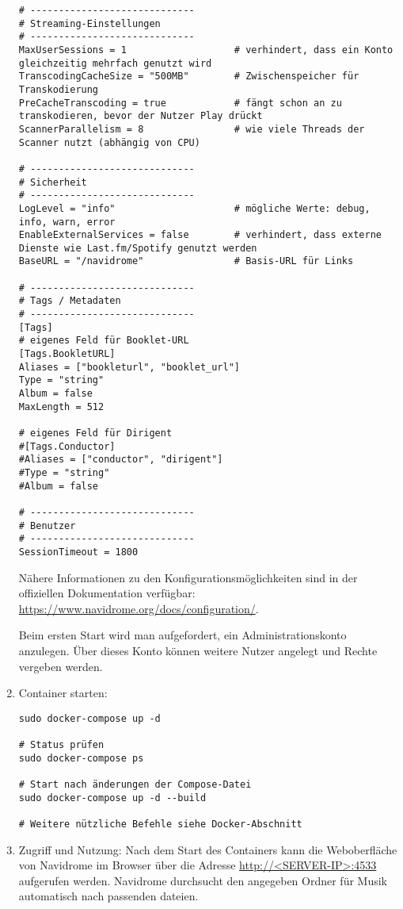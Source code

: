 \documentclass[12pt,a4paper]{report}
\begin{document}
\begin{enumerate}
\begin{verbatim}
# -----------------------------
# Streaming-Einstellungen
# -----------------------------
MaxUserSessions = 1                   # verhindert, dass ein Konto gleichzeitig mehrfach genutzt wird
TranscodingCacheSize = "500MB"        # Zwischenspeicher für Transkodierung
PreCacheTranscoding = true            # fängt schon an zu transkodieren, bevor der Nutzer Play drückt
ScannerParallelism = 8                # wie viele Threads der Scanner nutzt (abhängig von CPU)

# -----------------------------
# Sicherheit
# -----------------------------
LogLevel = "info"                     # mögliche Werte: debug, info, warn, error
EnableExternalServices = false        # verhindert, dass externe Dienste wie Last.fm/Spotify genutzt werden
BaseURL = "/navidrome"                # Basis-URL für Links

# -----------------------------
# Tags / Metadaten
# -----------------------------
[Tags]
# eigenes Feld für Booklet-URL
[Tags.BookletURL]
Aliases = ["bookleturl", "booklet_url"]
Type = "string"
Album = false
MaxLength = 512

# eigenes Feld für Dirigent
#[Tags.Conductor]
#Aliases = ["conductor", "dirigent"]
#Type = "string"
#Album = false

# -----------------------------
# Benutzer
# -----------------------------
SessionTimeout = 1800
    \end{verbatim}

    Nähere Informationen zu den Konfigurationsmöglichkeiten sind in der offiziellen Dokumentation verfügbar:
    \url{https://www.navidrome.org/docs/configuration/}.
    
    Beim ersten Start wird man aufgefordert, ein Administrationskonto anzulegen.
    Über dieses Konto können weitere Nutzer angelegt und Rechte vergeben werden.

    \item Container starten:
    \begin{verbatim}
sudo docker-compose up -d

# Status prüfen
sudo docker-compose ps

# Start nach änderungen der Compose-Datei
sudo docker-compose up -d --build

# Weitere nützliche Befehle siehe Docker-Abschnitt
    \end{verbatim}

    \item Zugriff und Nutzung:
    Nach dem Start des Containers kann die Weboberfläche von Navidrome im Browser über die Adresse \url{http://<SERVER-IP>:4533} aufgerufen werden.   
    Navidrome durchsucht den angegeben Ordner für Musik automatisch nach passenden dateien.  
  

\end{enumerate}
\end{document}

